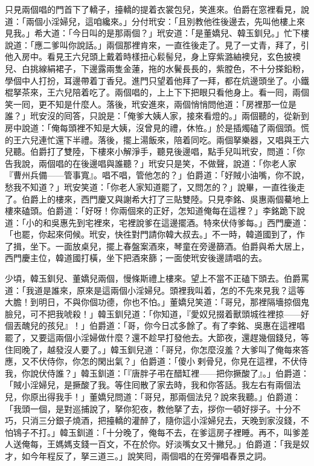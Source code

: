 只見兩個唱的門首下了轎子，擡轎的提着衣裳包兒，笑進來。伯爵在窓裡看見，說道：「兩個小淫婦兒，這咱纔來。」分付玳安：「且別教他徃後邊去，先叫他樓上來見我。」希大道：「今日叫的是那兩個？」玳安道：「是董嬌兒、韓玉釧兒。」忙下樓說道：「應二爹叫你說話。」兩個那裡肯來，一直徃後走了。見了一丈青，拜了，引他入房中。看見王六兒頭上戴着時樣扭心鬏髻兒，身上穿紫潞紬襖兒，玄色披襖兒、白挑線絹裙子，下邊露兩隻金蓮，拖的水鬢長長的，紫膛色，不十分搽鉛粉，學個中人打扮，耳邊帶着丁香兒。進門只望着他拜了一拜，都在炕邊頭坐了。小鐵棍拏茶來，王六兒陪着吃了。兩個唱的，上上下下把眼只看他身上。看一囘，兩個笑一囘，更不知是什麼人。落後，玳安進來，兩個悄悄問他道：「房裡那一位是誰？」玳安沒的囘答，只說是：「俺爹大姨人家，接來看燈的。」兩個聽的，從新到房中說道：「俺每頭裡不知是大姨，沒曾見的禮，休恠。」於是插燭磕了兩個頭。慌的王六兒連忙還下半禮。落後，擺上湯飯來，陪着同吃。兩個拏樂器，又唱與王六兒聽。伯爵打了雙陸，下樓來小解淨手，聽見後邊唱，點手兒叫玳安，{}問道：「你告我說，兩個唱的在後邊唱與誰聽？」玳安只是笑，不做聲，說道：「你老人家『曹州兵備——管事寬』。唱不唱，管他怎的？」伯爵道：「好賊小油嘴，你不說，愁我不知道？」玳安笑道：「你老人家知道罷了，又問怎的？」說畢，一直徃後走了。{}伯爵上的樓來，西門慶又與謝希大打了三貼雙陸。只見李銘、吳惠兩個驀地上樓來磕頭。伯爵道：「好呀！你兩個來的正好，怎知道俺每在這裡？」李銘跪下說道：「小的和吳惠先到宅裡來，宅裡說爹在這邊擺酒。特來伏侍爹每。」西門慶道：「也罷，你起來伺候。玳安，快徃對門請你韓大叔去。」不一時，韓道國到了，作了揖，坐下。一面放桌兒，擺上春盤案酒來，琴童在旁邊篩酒。伯爵與希大居上，西門慶主位，韓道國打橫，坐下把酒來篩；一面使玳安後邊請唱的去。

少頃，韓玉釧兒、董嬌兒兩個，慢條斯禮上樓來。望上不當不正磕下頭去。伯爵罵道：「我道是誰來，原來是這兩個小淫婦兒。頭裡我叫着，怎的不先來見我？這等大膽！到明日，不與你個功德，你也不怕。」董嬌兒笑道：「哥兒，那裡隔墻掠個鬼臉兒，可不把我唬殺！」韓玉釧兒道：「你知道，『愛奴兒掇着獸頭城徃裡掠——好個丟醜兒的孩兒』！」伯爵道：「哥，你今日忒多餘了。有了李銘、吳惠在這裡唱罷了，又要這兩個小淫婦做什麼？還不趁早打發他去。大節夜，還趕幾個錢兒，等住囘晚了，越發沒人要了。」韓玉釧兒道：「哥兒，你怎麼沒羞？大爹叫了俺每來答應，又不伏侍你，你怎的閑出氣？」伯爵道：「傻小𢱉剌骨兒，你見在這裡，不伏侍我，你說伏侍誰？」韓玉釧道：「『唐胖子弔在醋缸裡——把你撅酸了』。」伯爵道：「賊小淫婦兒，是撅酸了我。等住囘散了家去時，我和你答話。我左右有兩個法兒，你原出得我手！」董嬌兒問道：「哥兒，那兩個法兒？說來我聽。」伯爵道：「我頭一個，是對巡捕說了，拏你犯夜，教他拏了去，拶你一頓好拶子。十分不巧，只消三分銀子燒酒，把擡轎的灌醉了，隨你這小淫婦兒去，天晚到家沒錢，不怕鴇子不打。」韓玉釧道：「十分晚了，俺每不去，在爹這房子裡睡。再不，叫爹差人送俺每，王媽媽支錢一百文，不在於你。好淡嘴女又十撇兒。」{}伯爵道：「我是奴才，如今年程反了，拏三道三。」說笑囘，兩個唱的在旁彈唱春景之詞。

